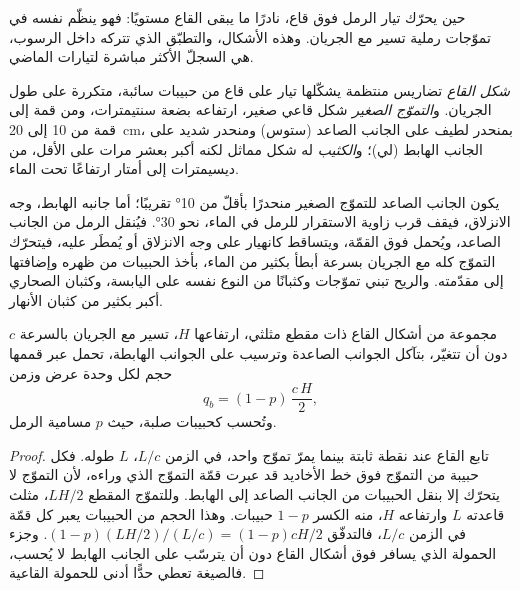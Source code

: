 حين يحرّك تيار الرمل فوق قاع، نادرًا ما يبقى القاع مستويًا: فهو ينظّم نفسه في تموّجات رملية تسير مع الجريان. وهذه الأشكال، والتطبّق الذي تتركه داخل الرسوب، هي السجلّ الأكثر مباشرة لتيارات الماضي.

\begin{definition}\label{def:b1:clastic-sediments:bedform}
\emph{شكل القاع} تضاريس منتظمة يشكّلها تيار على قاع من حبيبات سائبة، متكررة على طول الجريان. و\emph{التموّج الصغير} شكل قاعي صغير، ارتفاعه بضعة سنتيمترات، ومن قمة إلى قمة من 10 إلى \qty{20}{cm}، بمنحدر لطيف على الجانب الصاعد (ستوس) ومنحدر شديد على الجانب الهابط (لي)؛ و\emph{الكثيب} له شكل مماثل لكنه أكبر بعشر مرات على الأقل، من ديسيمترات إلى أمتار ارتفاعًا تحت الماء.
\end{definition}

يكون الجانب الصاعد للتموّج الصغير منحدرًا بأقلّ من \ang{10} تقريبًا؛ أما جانبه الهابط، وجه الانزلاق، فيقف قرب زاوية الاستقرار للرمل في الماء، نحو \ang{30}. فيُنقل الرمل من الجانب الصاعد، ويُحمل فوق القمّة، ويتساقط كانهيار على وجه الانزلاق أو يُمطَر عليه، فيتحرّك التموّج كله مع الجريان بسرعة أبطأ بكثير من الماء، بأخذ الحبيبات من ظهره وإضافتها إلى مقدّمته. والريح تبني تموّجات وكثبانًا من النوع نفسه على اليابسة، وكثبان الصحاري أكبر بكثير من كثبان الأنهار.

\begin{proposition}\label{prop:b1:clastic-sediments:migration}
مجموعة من أشكال القاع ذات مقطع مثلثي، ارتفاعها $H$، تسير مع الجريان بالسرعة $c$ دون أن تتغيّر، بتآكل الجوانب الصاعدة وترسيب على الجوانب الهابطة، تحمل عبر قممها حجم  لكل وحدة عرض وزمن
\[
  q_b = (1 - p)\,\frac{c\,H}{2},
\]
وتُحسب كحبيبات صلبة، حيث $p$ مسامية الرمل.
\end{proposition}

\begin{proof}
تابع القاع عند نقطة ثابتة بينما يمرّ تموّج واحد، في الزمن $L/c$، $L$
طوله. فكل حبيبة من التموّج فوق خط الأخاديد قد عبرت قمّة التموّج الذي وراءه، لأن التموّج لا يتحرّك إلا بنقل الحبيبات من الجانب الصاعد إلى الهابط. وللتموّج المقطع $LH/2$، مثلث قاعدته $L$ وارتفاعه $H$، منه الكسر $1 - p$ حبيبات. وهذا الحجم من الحبيبات يعبر كل قمّة في الزمن $L/c$، فالتدفّق $(1-p)(LH/2)/(L/c) = (1-p)cH/2$. وجزء الحمولة الذي يسافر فوق أشكال القاع دون أن يترسّب على الجانب الهابط لا يُحسب، فالصيغة تعطي حدًّا أدنى للحمولة القاعية.
\end{proof}

